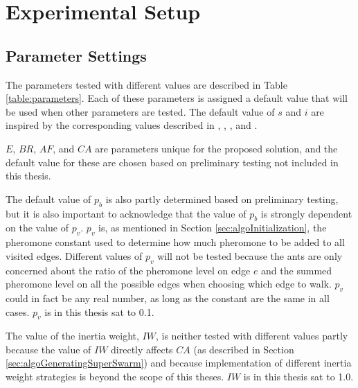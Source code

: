 \section{Experimental Setup}

 
\subsection{Parameter Settings}
\label{subsec:parameterSettings_setup}
The parameters tested with different values are described in Table \vref{table:parameters}. Each of these parameters is assigned a default value that will be used when other parameters are tested. The default value of $s$ and $i$ are inspired by the corresponding values described in \citet{salehi-nezhad07}, \citet{poorzahedy11}, \citet{sedighpour14}, and \citet{kechagiopoulos14}. 

$E$, $BR$, $AF$, and $CA$ are parameters unique for the proposed solution, and the default value for these are chosen based on preliminary testing not included in this thesis. 

The default value of $p_b$ is also partly determined based on preliminary testing, but it is also important to acknowledge that the value of $p_b$ is strongly dependent on the value of $p_v$. $p_v$ is, as mentioned in Section \vref{sec:algoInitialization}, the pheromone constant used to determine how much pheromone to be added to all visited edges. Different values of $p_v$ will not be tested because the ants are only concerned about the ratio of the pheromone level on edge $e$ and the summed pheromone level on all the possible edges when choosing which edge to walk. $p_v$ could in fact be any real number, as long as the constant are the same in all cases. $p_v$ is in this thesis sat to 0.1. 

The value of the inertia weight, $IW$, is neither tested with different values partly because the value of $IW$ directly affects $CA$ (as described in Section \vref{sec:algoGeneratingSuperSwarm}) and because implementation of different inertia weight strategies is beyond the scope of this theses. $IW$ is in this thesis sat to 1.0. 

